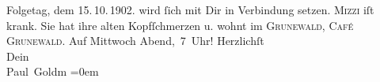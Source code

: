 \begin{ledgroupsized}[t]{13cm}
{{{                  Folgetag, dem 15. 10. 1902.}}}\label{K_L03227-2h} wird ſich mit Dir in Verbindung setzen.\pend
           \pstart
           \textsc{Mizzi} iſt krank. Sie {\pb}hat ihre alten Kopfſchmerzen
               u. wohnt im \textsc{Grunewald}, \textsc{Café Grunewald}.\pend
           \pstart
           Auf Mittwoch{ }Abend, 7 Uhr!\pend
           \pstart
           Herzlichſt {\\[\baselineskip]}Dein {\\[\baselineskip]}\spacefill\mbox{Paul Goldm}\pend
           \leftskip=0em{}
         
         \endnumbering{}\end{ledgroupsized}  \newcommand{\dateiname}{L03227}\newcommand{\titel}{Paul Goldmann an Arthur Schnitzler, 14. 10. [1902]}\newcommand{\editorInnen}{Martin Anton Müller und Laura Untner}
      